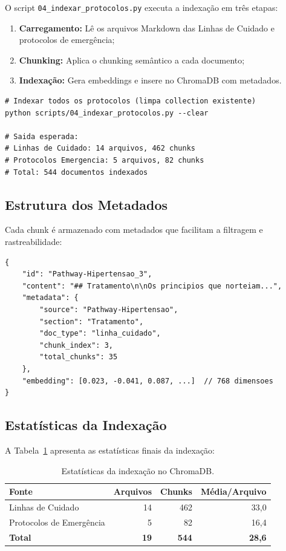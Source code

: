 O script \texttt{04\_indexar\_protocolos.py} executa a indexação em três etapas:

\begin{enumerate}
    \item \textbf{Carregamento:} Lê os arquivos Markdown das Linhas de Cuidado e protocolos de emergência;
    \item \textbf{Chunking:} Aplica o chunking semântico a cada documento;
    \item \textbf{Indexação:} Gera embeddings e insere no ChromaDB com metadados.
\end{enumerate}

\begin{lstlisting}[style=bash, caption={Executando a indexação de protocolos.}]
# Indexar todos os protocolos (limpa collection existente)
python scripts/04_indexar_protocolos.py --clear

# Saida esperada:
# Linhas de Cuidado: 14 arquivos, 462 chunks
# Protocolos Emergencia: 5 arquivos, 82 chunks
# Total: 544 documentos indexados
\end{lstlisting}

\subsection{Estrutura dos Metadados}

Cada chunk é armazenado com metadados que facilitam a filtragem e rastreabilidade:

\begin{lstlisting}[caption={Estrutura de metadados de um chunk indexado.}]
{
    "id": "Pathway-Hipertensao_3",
    "content": "## Tratamento\n\nOs principios que norteiam...",
    "metadata": {
        "source": "Pathway-Hipertensao",
        "section": "Tratamento",
        "doc_type": "linha_cuidado",
        "chunk_index": 3,
        "total_chunks": 35
    },
    "embedding": [0.023, -0.041, 0.087, ...]  // 768 dimensoes
}
\end{lstlisting}

\subsection{Estatísticas da Indexação}

A Tabela~\ref{tab:stats_indexacao} apresenta as estatísticas finais da indexação:

\begin{table}[H]
\centering
\caption{Estatísticas da indexação no ChromaDB.}
\label{tab:stats_indexacao}
\begin{tabular}{l r r r}
\toprule
\textbf{Fonte} & \textbf{Arquivos} & \textbf{Chunks} & \textbf{Média/Arquivo} \\
\midrule
Linhas de Cuidado & 14 & 462 & 33,0 \\
Protocolos de Emergência & 5 & 82 & 16,4 \\
\midrule
\textbf{Total} & \textbf{19} & \textbf{544} & \textbf{28,6} \\
\bottomrule
\end{tabular}
\end{table}


